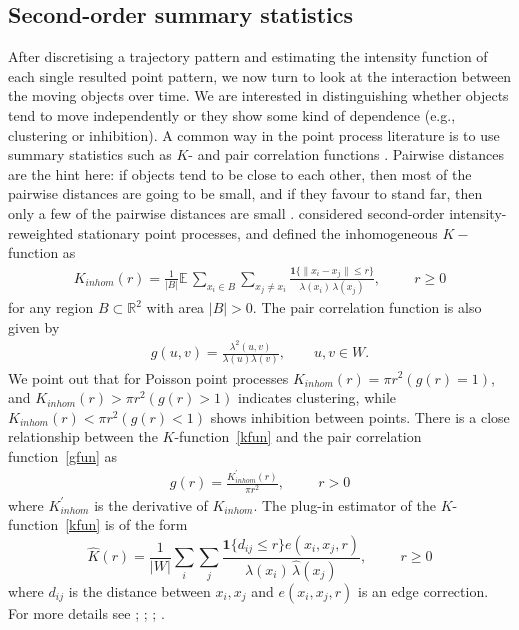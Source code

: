 \documentclass[article]{jss}
\newcommand{\R}{\mathbb{R}}
\newcommand{\ee}{\mathbb{E}}
\begin{document}
\subsection{Second-order summary statistics}
  After discretising a trajectory pattern and estimating the intensity function of each single resulted point pattern, we now turn to look at the interaction between the moving objects over time. We are interested in distinguishing whether objects tend to move independently or they show some kind of dependence (e.g., clustering or inhibition). A common way in the point process literature is to use summary statistics such as $K$- and pair correlation functions \citep{ripley77,baddeley00,BRT15}. Pairwise distances are the hint here: if objects tend to be close to each other, then most of the pairwise distances are going to be small, and if they favour to stand far, then only a few of the pairwise distances are small \citep{BRT15}.  \cite{baddeley00} considered second-order intensity-reweighted stationary point processes, and defined the inhomogeneous $K-$function as
  \begin{eqnarray}\label{kfun}
  K_{inhom}(r) =
  \frac{1}{|B|} \ee \,
  \sum_{x_i \in B} \sum_{x_j \neq x_i} 
  \frac{\textbf{1} \{ \|x_i - x_j\| \le r \} }{ \lambda(x_i) \, \lambda(x_j)}, \hspace{1cm} r \geq 0
  \end{eqnarray}
  for any region $B \subset \R^2$ with area $|B| > 0$. The pair correlation function is also given by
  \begin{eqnarray}\label{gfun}
  g(u,v)=\frac{\lambda^2(u,v)}{\lambda(u) \lambda(v)}, \qquad u,v \in W.
  \end{eqnarray}
  We point out that for Poisson point processes $K_{inhom}(r)=\pi r^2 (g(r)=1)$, and $K_{inhom}(r)>\pi r^2 (g(r)>1)$ indicates clustering, while $K_{inhom}(r)<\pi r^2 (g(r)<1)$ shows inhibition between points. There is a close relationship between the $K$-function~\ref{kfun} and the pair correlation function~\ref{gfun} as 
  \begin{eqnarray*}
  g(r)=\frac{K^{'}_{inhom}(r)}{\pi r^2}, \hspace{1cm} r>0
\end{eqnarray*}
where $K^{'}_{inhom}$ is the derivative of $K_{inhom}$.
  The plug-in estimator of the $K$-function~\ref{kfun} is of the form
  \begin{equation}\label{e:hatKinhom:plugin}
  \widehat{K}(r) =
  \frac{1}{|W|}\sum_i \sum_j 
  \frac{\textbf{1}\{d_{ij} \le r\} e(x_i,x_j,r)}{\widehat\lambda(x_i) \, \widehat\lambda(x_j)}, \hspace{1cm} r \geq 0
  \end{equation}
  where $d_{ij}$ is the distance between $x_i,x_j$ and $e(x_i,x_j,r)$ is an edge correction. For more details see \citet[Chapter 4]{MW03}; \cite{IPSS08,D13}; \cite{gabriel2014}; \citet[Chapter 7]{BRT15}.
\end{document}
